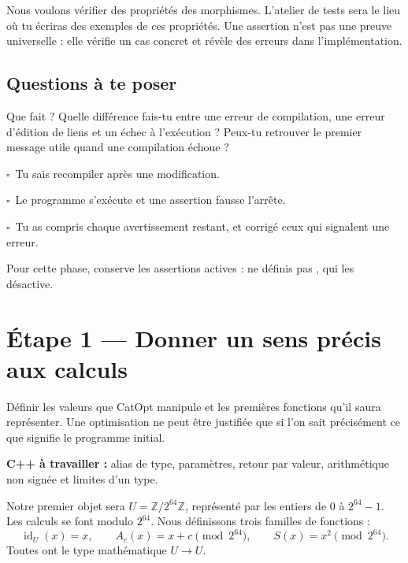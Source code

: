 \documentclass[11pt,a4paper]{article}
\newcommand{\code}[1]{\texttt{\detokenize{#1}}}
\newcommand{\Id}{\operatorname{id}}
\newcommand{\checkpoint}{\(\square\)\ }
\newcommand{\etape}[2]{\clearpage\section{Étape #1 — #2}}
\begin{document}
\begin{theorie}
Nous voulons vérifier des propriétés des morphismes. L'atelier de tests sera
le lieu où tu écriras des exemples de ces propriétés. Une assertion n'est pas
une preuve universelle : elle vérifie un cas concret et révèle des erreurs
dans l'implémentation.
\end{theorie}

\subsection{Questions à te poser}
Que fait \code{#include} ? Quelle différence fais-tu entre une erreur de
compilation, une erreur d'édition de liens et un échec à l'exécution ?
Peux-tu retrouver le premier message utile quand une compilation échoue ?

\begin{validation}
\checkpoint Tu sais recompiler après une modification.\par
\checkpoint Le programme s'exécute et une assertion fausse l'arrête.\par
\checkpoint Tu as compris chaque avertissement restant, et corrigé ceux qui
signalent une erreur.\par
Pour cette phase, conserve les assertions actives : ne définis pas
\code{NDEBUG}, qui les désactive.
\end{validation}

\etape{1}{Donner un sens précis aux calculs}
\label{sec:scalaires}
\begin{objectif}
Définir les valeurs que CatOpt manipule et les premières fonctions qu'il
saura représenter. Une optimisation ne peut être justifiée que si l'on sait
précisément ce que signifie le programme initial.
\end{objectif}

\textbf{C++ à travailler :} alias de type, paramètres, retour par valeur,
arithmétique non signée et limites d'un type.

\begin{theorie}
Notre premier objet sera \(U=\mathbb{Z}/2^{64}\mathbb{Z}\), représenté par les
entiers de \(0\) à \(2^{64}-1\). Les calculs se font modulo \(2^{64}\).
Nous définissons trois familles de fonctions :
\[
\Id_U(x)=x,\qquad A_c(x)=x+c\pmod{2^{64}},\qquad
S(x)=x^2\pmod{2^{64}}.
\]
Toutes ont le type mathématique \(U\to U\).
\end{theorie}
\end{document}
